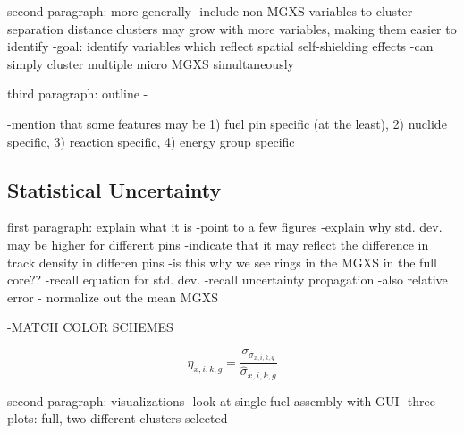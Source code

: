 second paragraph: more generally
-include non-\ac{MGXS} variables to cluster
  -separation distance clusters may grow with more variables, making them easier to identify
-goal: identify variables which reflect spatial self-shielding effects
-can simply cluster multiple micro \ac{MGXS} simultaneously

third paragraph: outline
-

-mention that some features may be 1) fuel pin specific (at the least), 2) nuclide specific, 3) reaction specific, 4) energy group specific

\subsection{Statistical Uncertainty}
\label{subsec:chap10-stat-uncertainty}

first paragraph: explain what it is
-point to a few figures
-explain why std. dev. may be higher for different pins
-indicate that it may reflect the difference in track density in differen pins
  -is this why we see rings in the \ac{MGXS} in the full core??
-recall equation for std. dev.
-recall uncertainty propagation
-also relative error - normalize out the mean \ac{MGXS}

-MATCH COLOR SCHEMES

\begin{equation}
\label{eqn:chap10-rel-err}
\eta_{x,i,k,g} = \frac{\sigma_{\hat{\sigma}_{x,i,k,g}}}{\hat{\sigma}_{x,i,k,g}}
\end{equation}

second paragraph: visualizations
-look at single fuel assembly with GUI
-three plots: full, two different clusters selected

